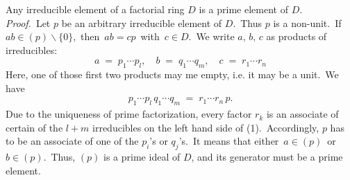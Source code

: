 \documentclass[12pt]{article}
\theoremstyle{definition}
\begin{document}

Any irreducible element of a factorial ring $D$ is a prime element of $D$.\\

{\em Proof.}\, Let $p$ be an arbitrary irreducible element of $D$.\, Thus $p$ is a non-unit.\,  If\, 
$ab \in (p)\smallsetminus\{0\}$,\, then\, $ab = cp$\, with\, 
$c \in D$.\, We write $a,\,b,\,c$ as products of irreducibles:
$$a \;=\; p_1\cdots p_l, \quad b \;=\; q_1\cdots q_m, \quad c \;=\; r_1\cdots r_n$$
Here, one of those first two products may me empty, i.e. it may be a unit.\, We have
\begin{align}
p_1\cdots p_l\,q_1\cdots q_m \;=\; r_1\cdots r_n\,p.
\end{align}
Due to the uniqueness of prime factorization, every factor $r_k$ is an associate of certain of the $l\!+\!m$ irreducibles on the left hand side of (1).\, Accordingly, $p$ has to be an associate of one of the $p_i$'s or $q_j$'s.\, It means that either\, $a \in (p)$\, or\, $b \in (p)$.\, Thus, $(p)$ is a prime ideal of $D$, and its generator must be a prime element.



\end{document}
